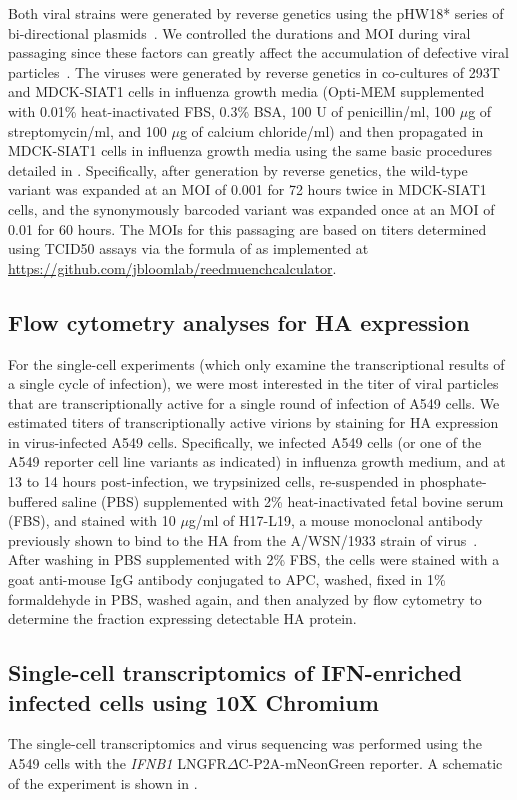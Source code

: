 \documentclass[9pt,lineno]{elife}
\begin{document}
Both viral strains were generated by reverse genetics using the pHW18* series of bi-directional plasmids~\citep{hoffmann2000dna}.
We controlled the durations and MOI during viral passaging since these factors can greatly affect the accumulation of defective viral particles~\citep{xue2016propagation}.
The viruses were generated by reverse genetics in co-cultures of 293T and MDCK-SIAT1 cells in influenza growth media (Opti-MEM supplemented with 0.01\% heat-inactivated FBS, 0.3\% BSA, 100 U of penicillin/ml, 100 $\mu$g of streptomycin/ml, and 100 $\mu$g of calcium chloride/ml) and then propagated in MDCK-SIAT1 cells in influenza growth media using the same basic procedures detailed in \citet{russell2018extreme}.
Specifically, after generation by reverse genetics, the wild-type variant was expanded at an MOI of 0.001 for 72 hours twice in MDCK-SIAT1 cells, and the synonymously barcoded variant was expanded once at an MOI of 0.01 for 60 hours.
The MOIs for this passaging are based on titers determined using TCID50 assays via the formula of \citet{reed1938simple} as implemented at \url{https://github.com/jbloomlab/reedmuenchcalculator}.

\subsection{Flow cytometry analyses for HA expression}
For the single-cell experiments (which only examine the transcriptional results of a single cycle of infection), we were most interested in the titer of viral particles that are transcriptionally active for a single round of infection of A549 cells.
We estimated titers of transcriptionally active virions by staining for HA expression in virus-infected A549 cells.
Specifically, we infected A549 cells (or one of the A549 reporter cell line variants as indicated) in influenza growth medium, and at 13 to 14 hours post-infection, we trypsinized cells, re-suspended in phosphate-buffered saline (PBS) supplemented with 2\% heat-inactivated fetal bovine serum (FBS), and stained with 10 $\mu$g/ml of H17-L19, a mouse monoclonal antibody previously shown to bind to the HA from the A/WSN/1933 strain of virus~\citep{doud2017complete}.
After washing in PBS supplemented with 2\% FBS, the cells were stained with a goat anti-mouse IgG antibody conjugated to APC, washed, fixed in 1\% formaldehyde in PBS, washed again, and then analyzed by flow cytometry to determine the fraction expressing detectable HA protein.

\subsection{Single-cell transcriptomics of IFN-enriched infected cells using 10X Chromium}
The single-cell transcriptomics and virus sequencing was performed using the A549 cells with the \textit{IFNB1} LNGFR$\Delta$C-P2A-mNeonGreen reporter.
A schematic of the experiment is shown in .
\end{document}
